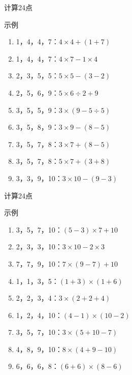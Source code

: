 \documentclass[aspectratio=169]{ctexbeamer} %
\begin{document}
\begin{frame}[t]{计算24点}
\begin{spacing}{1.2}
\normalsize
\alert{示例}
\begin{enumerate}[label={\arabic*.}]
\item 1，4，4，7：\pause $4 \times 4 + (1+ 7)$
\item 1，4，4，7：\pause $4 \times 7 - 1 \times 4$
\item 2，3，5，5：\pause $5 \times 5 - (3 - 2)$
\item 2，5，6，9：\pause $5 \times 6 \div 2 + 9$
\item 3，5，5，9：\pause $3 \times (9 - 5 \div 5)$
\item 3，5，8，9：\pause $3 \times 9 - (8 - 5)$
\item 3，5，7，8：\pause $3 \times 7 + (8 - 5)$
\item 3，5，7，8：\pause $5 \times 7 + (3 + 8)$
\item 3，3，9，10：\pause $3 \times 10 - (9 - 3)$
\end{enumerate}
\end{spacing}
\end{frame}

\begin{frame}[t]{计算24点}
\begin{spacing}{1.2}
\normalsize
\alert{示例}
\begin{enumerate}[label={\arabic*.}]
\item 3，5，7，10：\pause $(5 - 3) \times 7 + 10$
\item 2，3，3，10：\pause $3 \times 10 - 2 \times 3$
\item 7，7，9，10：\pause $7 \times (9 - 7) + 10$
\item 1，1，3，5：\pause $(1 + 3) \times (1 + 6)$
\item 2，2，3，4：\pause $3 \times (2 + 2 + 4)$
\item 1，2，4，10：\pause $(4 - 1) \times (10 - 2)$
\item 3，5，7，10：\pause $3 \times (5 + 10 - 7)$
\item 4，8，9，10：\pause $8 \times (4 + 9 - 10)$
\item 6，6，6，8：\pause $(6 + 6) \times (8 - 6)$
\end{enumerate}
\end{spacing}
\end{frame}
\end{document}

